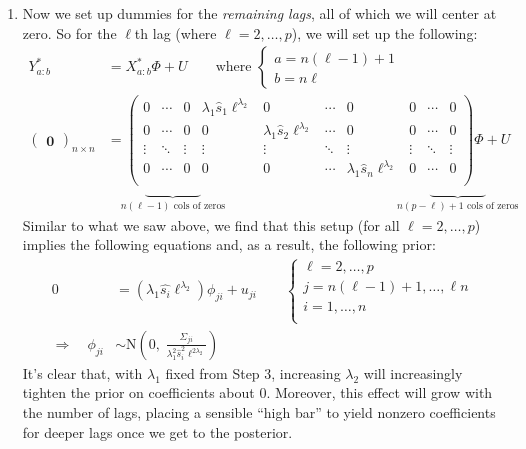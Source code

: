 \documentclass[a4paper,12pt]{scrartcl}
\begin{document}
\begin{enumerate}
    \item Now we set up dummies for the \emph{remaining lags},
	all of which we will center at zero. So for the $\ell$th
	lag (where $\ell = 2, \ldots, p$), we will set up the 
	following: 
	\begin{align*}
	    Y^*_{a:b} &= 
	    X^*_{a:b} \Phi + U \qquad 
	    \text{where } \begin{cases} a = n(\ell-1) + 1 \\
					b = n\ell
			\end{cases} \\
	    \begin{pmatrix} \mathbf{0} \end{pmatrix}_{n\times n}
		&= \begin{pmatrix} 
		    0 & \cdots & 0 & 
		    \lambda_1 \hat{s}_1 \ell^{\lambda_2} & 0 & 
		    \cdots & 0 & 0 & \cdots & 0 \\
		    0 & \cdots & 0 & 0 
		    & \lambda_1 \hat{s}_2 \ell^{\lambda_2} 
		    & \cdots & 0 & 0 & \cdots & 0 \\
		    \vdots & \ddots & \vdots & \vdots & \vdots & 
		    \ddots & \vdots  & \vdots & \ddots & \vdots \\
		    0 & \cdots & 0 & 0 & 0 & \cdots
		    & \lambda_1 \hat{s}_n \ell^{\lambda_2} 
		    & 0 & \cdots & 0 \\
		\end{pmatrix} \Phi + U \\
	    & \quad \underbrace{\qquad\qquad}_{n(\ell-1)
		\text{ cols of zeros}} \qquad \qquad
		\qquad \qquad \qquad \qquad \;
		\underbrace{\qquad\qquad}_{n(p-\ell) + 1
		\text{ cols of zeros}} 
	\end{align*}
	Similar to what we saw above, we find that this
	setup (for all $\ell = 2, \ldots, p$) 
	implies the following equations and, as a result,
	the following prior:
	\begin{align*}
	    0 &= \left(\lambda_1 
	    \hat{s_i}\ell^{\lambda_2}\right) \phi_{ji} + u_{ji} 
	    \qquad 
	    \begin{cases} \ell = 2, \ldots, p \\ 
		j = n(\ell-1)+1, \ldots, \ell n\\
		i = 1, \ldots, n \\
	    \end{cases} \\
	\Rightarrow \quad \phi_{ji} &\sim 
	    \text{N}\left(0, \; \frac{\Sigma_{ji}}{
	    \lambda_1^2 \hat{s}_i^2 \ell^{2\lambda_2} }\right)
	\end{align*}
	It's clear that, with $\lambda_1$ fixed from Step 3,
	increasing $\lambda_2$ will increasingly tighten 
	the prior on coefficients about 0. 
	Moreover, this effect will grow with the number of
	lags, placing a sensible ``high bar'' to yield
	nonzero coefficients for deeper lags once we get to
	the posterior. 
	

\end{enumerate}
\end{document}

